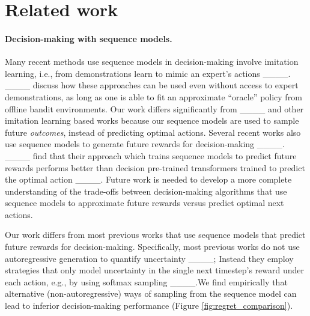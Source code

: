 \section{Related work}
\label{sec:related-work}

\paragraph{Decision-making with sequence models.}
Many recent methods use sequence models in decision-making involve imitation learning, i.e., from demonstrations learn to mimic an expert's actions ____. ____ discuss how these approaches can be used even without access to expert demonstrations, as long as one is able to fit an approximate ``oracle'' policy from offline bandit environments. Our work differs significantly from ____ and other imitation learning based works because our sequence models are used to sample future \textit{outcomes}, instead of predicting optimal actions. 
Several recent works also use sequence models to generate future rewards for decision-making ____. ____ find that their approach which trains sequence models to predict future rewards performs better than decision pre-trained transformers trained to predict the optimal action ____. Future work is needed to develop a more complete understanding of the trade-offs between decision-making algorithms that use sequence models to approximate future rewards versus predict optimal next actions.

Our work differs from most previous works that use sequence models that predict future rewards for decision-making. Specifically, most previous works do not use autoregressive generation to quantify uncertainty ____; Instead they employ strategies that only model uncertainty in the single next timestep's reward under each action, e.g., by using softmax sampling ____.We find empirically that alternative (non-autoregressive) ways of sampling from the sequence model can lead to inferior decision-making performance (Figure \ref{fig:regret_comparison}). 


